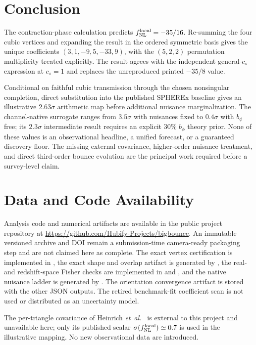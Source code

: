 \documentclass[aps,prd,twocolumn,superscriptaddress,showpacs,preprintnumbers,nofootinbib,longbibliography,floatfix]{revtex4-2}
\newcommand{\fnl}{f_{\rm NL}}
\newcommand{\etal}{\textit{et~al.}}
\begin{document}
\section{Conclusion}
\label{sec:conclusion}

The contraction-phase calculation predicts $\fnl^{\rm local}=-35/16$. Re-summing the four cubic vertices and expanding the result in the ordered symmetric basis gives the unique coefficients $(3,1,-9,5,-33,9)$, with the $(5,2,2)$ permutation multiplicity treated explicitly. The result agrees with the independent general-$c_s$ expression at $c_s=1$ and replaces the unreproduced printed $-35/8$ value.

Conditional on faithful cubic transmission through the chosen nonsingular completion, direct substitution into the published SPHEREx baseline gives an illustrative $2.63\sigma$ arithmetic map before additional nuisance marginalization. The channel-native surrogate ranges from $3.5\sigma$ with nuisances fixed to $0.4\sigma$ with $b_\phi$ free; its $2.3\sigma$ intermediate result requires an explicit 30\% $b_\phi$ theory prior. None of these values is an observational headline, a unified forecast, or a guaranteed discovery floor. The missing external covariance, higher-order nuisance treatment, and direct third-order bounce evolution are the principal work required before a survey-level claim.

\section*{Data and Code Availability}

Analysis code and numerical artifacts are available in the public project repository at \url{https://github.com/Hubify-Projects/bigbounce}. An immutable versioned archive and DOI remain a submission-time camera-ready packaging step and are not claimed here as complete. The exact vertex certification is implemented in , the exact shape and overlap artifact is generated by , the real- and redshift-space Fisher checks are implemented in  and , and the native nuisance ladder is generated by . The orientation convergence artifact is stored with the other JSON outputs. The retired benchmark-fit coefficient scan is not used or distributed as an uncertainty model.

The per-triangle covariance of Heinrich \etal~\cite{Heinrich:2023} is external to this project and unavailable here; only its published scalar $\sigma(\fnl^{\rm local})\simeq0.7$ is used in the illustrative mapping. No new observational data are introduced.
\appendix
\end{document}
